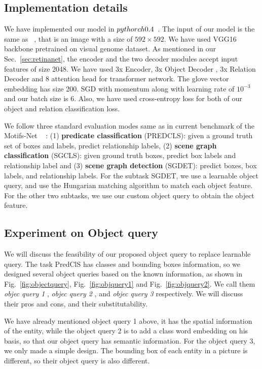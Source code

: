 \subsection{Implementation details}
We have implemented our model in $ pythorch\-0.4 $~\cite{paszke2019pytorch}. The input of our model is the same as~\cite{zellers2018neural} , that is an image with a size of $ 592 \times 592 $. We have used VGG16~\cite{simonyan2015deep} backbone pretrained on visual genome dataset. As mentioned in our Sec.~\ref{sec:retinanet}, the encoder and the two decoder modules accept input features of size 2048. We have used 3x Encoder, 3x Object Decoder , 3x Relation Decoder and 8 attention head for transformer network. The glove vector embedding has size 200. SGD with momentum along with learning rate of $ 10^{-3 }$ and our batch size is 6. Also, we have used cross-entropy loss for both of our object and relation classification loss.

We follow three standard evaluation modes same as in current benchmark of the Motifs-Net ~\cite{zellers2018neural}  : (1) \textbf{predicate classification} (PREDCLS): given a ground truth set of boxes and labels, predict relationship labels, (2) \textbf{scene graph classification} (SGCLS): given ground truth boxes, predict box labels and relationship label and (3) \textbf{scene graph detection} (SGDET): predict boxes, box labels, and relationship labels.
For the subtask SGDET, we use a learnable object query, and use the Hungarian matching algorithm to match each object feature. For the other two subtasks, we use our custom object query to obtain the object feature.


\subsection{Experiment on Object query}

We will discuss the feasibility of our proposed object query to replace learnable query. The task PredClS has classes and bounding boxes information, so we designed several object queries based on the known information, as shown in Fig.~\ref{fig:objectquery}, Fig.~\ref{fig:objquery1} and Fig.~\ref{fig:objquery2}. We call them  \textit{objec query 1} ,  \textit{objec query 2} , and  \textit{objec query 3}  respectively. We will discuss their pros and cons, and their substitutability.

We have already mentioned object query 1 above, it has the spatial information of the entity, while the object query 2 is to add a class word embedding on his basis, so that our object query has semantic information. For the object query 3, we only made a simple design. The bounding box of each entity in a picture is different, so their object query is also different.

